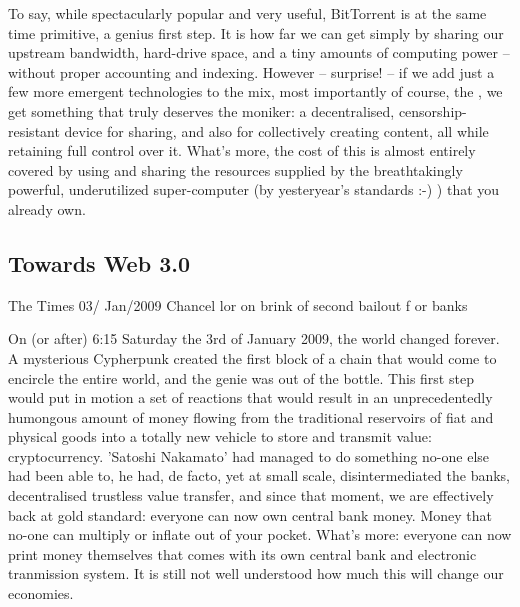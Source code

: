 To say, while spectacularly popular and very useful, BitTorrent is at the same time primitive, a genius first step. It is how far we can get simply by sharing our upstream bandwidth, hard-drive space, and a tiny amounts of computing power – without proper accounting and indexing. However – surprise! – if we add just a few more emergent technologies to the mix, most importantly of course, the , we get something that truly deserves the  moniker: a decentralised, censorship-resistant device for sharing, and also for collectively creating content, all while retaining full control over it. What's more, the cost of this is almost entirely covered by using and sharing the resources supplied by the breathtakingly powerful, underutilized super-computer (by yesteryear's standards :-) ) that you already own.

\subsection{Towards Web 3.0 \statusgreen}\label{sec:towards-web3}


\begin{centerverbatim}
The Times 03/
Jan/2009 Chancel
lor on brink of 
second bailout f
or banks
\end{centerverbatim}

On (or after) 6:15 Saturday the 3rd of January 2009, the world changed forever. A mysterious Cypherpunk created the first block of a chain that would come to encircle the entire world, and the genie was out of the bottle. This first step would put in motion a set of reactions that would result in an unprecedentedly humongous amount of money flowing from the traditional reservoirs of fiat and physical goods into a totally new vehicle to store and transmit value: cryptocurrency. 'Satoshi Nakamato' had managed to do something no-one else had been able to, he had, de facto, yet at small scale, disintermediated the banks, decentralised trustless value transfer, and since that moment, we are effectively back at gold standard: everyone can now own central bank money. Money that no-one can multiply or inflate out of your pocket. What's more: everyone can now print money themselves that comes with its own central bank and electronic tranmission system. It is still not well understood how much this will change our economies.

